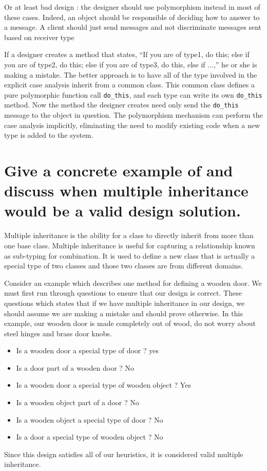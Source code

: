 Or at least bad design : the designer should use polymorphism instead in most of these cases. Indeed, an object should be responsible of deciding how to answer to a message. A client should just send messages and not discriminate messages sent based on receiver type

If a designer creates a method that states, \enquote{If you are of type1, do this; else if you are of type2, do this; else if you are of type3, do this, else if ...,} he or she is making a mistake. The better approach is to have all of the type involved in the explicit case analysis inherit from a common class. This common class defines a pure polymorphic function call \verb#do_this#, and each type can write its own \verb#do_this# method. Now the method the designer creates need only send the \verb#do_this# message to the object in question. The polymorphism mechanism can perform the case analysis implicitly, eliminating the need to modify existing code when a new type is added to the system.


\section{Give a concrete example of and discuss when multiple inheritance would be a valid design
solution.}

Multiple inheritance is the ability for a class to directly inherit from more than one base class. Multiple inheritance is useful for capturing a relationship known as sub-typing for combination. It is used to define a new class that is actually a special type of two classes and those two classes are from different domains.

Consider an example which describes one method for defining a wooden door. We must first run through questions to ensure that our design is correct. These questions which states that if we have multiple inheritance in our design, we should assume we are making a mistake and should prove otherwise. In this example, our wooden door is made completely out of wood, do not worry about steel hinges and brass door knobs.
\begin{itemize}
\item Is a wooden door a special type of door ? yes
\item Is a door part of a wooden door ? No
\item Is a wooden door a special type of wooden object ? Yes
\item Is a wooden object part of a door ? No
\item Is a wooden object a special type of door ? No
\item Is a door a special type of wooden object ? No
\end{itemize}

Since this design satisfies all of our heuristics, it is considered valid multiple inheritance.

